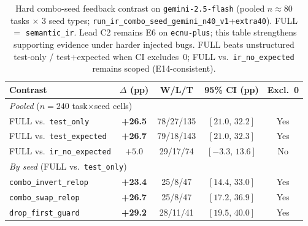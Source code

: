 \begin{table}[t]
  \centering
  \caption{Hard combo-seed feedback contrast on \texttt{gemini-2.5-flash}
    (pooled $n{\approx}80$ tasks $\times$ 3 seed types;
    \texttt{run\_ir\_combo\_seed\_gemini\_n40\_v1}+\texttt{extra40}).
    FULL $=$ \texttt{semantic\_ir}.
    Lead C2 remains E6 on \texttt{ecnu-plus}; this table strengthens
    supporting evidence under harder injected bugs.
    FULL beats unstructured test-only / test$+$expected when CI excludes~0;
    FULL vs.\ \texttt{ir\_no\_expected} remains scoped (E14-consistent).}
  \label{tab:gemini-combo-n80}
  \footnotesize
  \begin{tabular}{lcccc}
    \toprule
    Contrast & $\Delta$ (pp) & W/L/T & 95\% CI (pp) & Excl.~0 \\
    \midrule
    \multicolumn{5}{l}{\textit{Pooled} ($n{=}240$ task$\times$seed cells)} \\
    FULL vs.\ \texttt{test\_only} & \textbf{+26.5} & 78/27/135 & $[21.0,\,32.2]$ & Yes \\
    FULL vs.\ \texttt{test\_expected} & \textbf{+26.7} & 79/18/143 & $[21.0,\,32.3]$ & Yes \\
    FULL vs.\ \texttt{ir\_no\_expected} & $+5.0$ & 29/17/74 & $[-3.3,\,13.6]$ & No \\
    \midrule
    \multicolumn{5}{l}{\textit{By seed} (FULL vs.\ \texttt{test\_only})} \\
    \texttt{combo\_invert\_relop} & \textbf{+23.4} & 25/8/47 & $[14.4,\,33.0]$ & Yes \\
    \texttt{combo\_swap\_relop} & \textbf{+26.7} & 25/8/47 & $[17.2,\,36.9]$ & Yes \\
    \texttt{drop\_first\_guard} & \textbf{+29.2} & 28/11/41 & $[19.5,\,40.0]$ & Yes \\
    \bottomrule
  \end{tabular}
\end{table}
